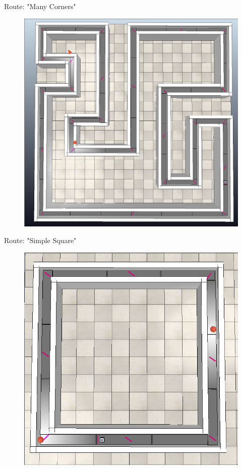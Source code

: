 \documentclass[10pt]{beamer}
\begin{document}
\begin{frame}{Route: "Many Corners"}
    \begin{figure}
        \centering
        \includegraphics[width=0.8\linewidth]{many_corners.png}
    \end{figure}
\end{frame}

\begin{frame}{Route: "Simple Square"}
    \begin{figure}
        \centering
        \includegraphics[width=0.8\linewidth]{simple_square.png}
    \end{figure}
\end{frame}
\end{document}
